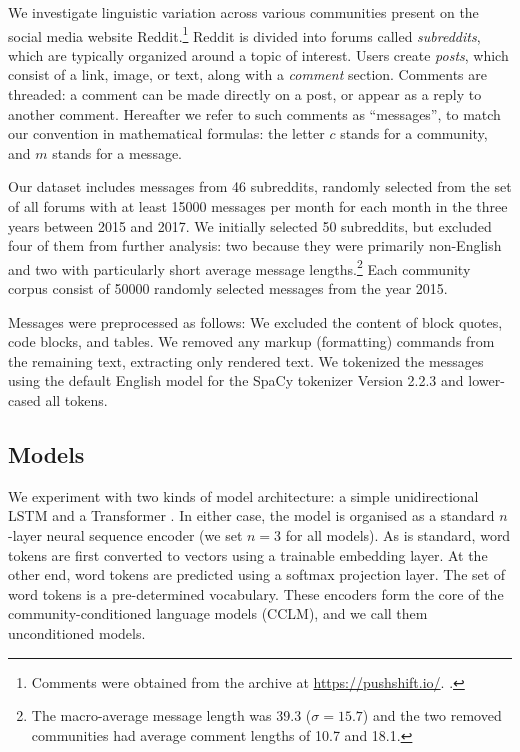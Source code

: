\documentclass[11pt,a4paper]{article}
\begin{document}
We investigate linguistic variation across various communities present
on the social media website Reddit.\footnote{Comments were obtained
  from the archive at \url{https://pushshift.io/}.
  \cite{Baumgartner2020}.}
%
Reddit is divided into forums called \textit{subreddits}, 
which are typically organized around a topic of interest. 
Users create \textit{posts}, which consist of a link, image, 
or text, along with a \emph{comment} section. 
Comments are threaded: a comment can be made directly on a post,
or appear as a reply to another comment.
%
Hereafter we refer to such comments as ``messages'', to match our
convention in mathematical formulas: the letter $c$ stands for a
community, and $m$ stands for a message.

Our dataset includes messages from \num{46} subreddits, 
randomly selected from the set of all forums 
with at least \num{15000} messages per month for each month
in the three years between 2015 and 2017. 
We initially selected \num{50} subreddits, 
but excluded four of them from further analysis: 
two because they were primarily non-English and two with particularly short average message lengths.\footnote{
The macro-average message length was \num{39.3} ($\sigma=15.7$) and the two removed communities had average comment lengths of \num{10.7} and \num{18.1}.}
Each community corpus consist of \num{50000} randomly selected messages from the year 2015.

Messages were preprocessed as follows: 
We excluded the content of block quotes, code blocks, and tables.
We removed any markup (formatting) commands from the remaining text, extracting only rendered text.
We tokenized the messages using the default English model for the SpaCy tokenizer Version 2.2.3 \citep{Honnibal2017}
and lower-cased all tokens.

\subsection{Models}

We experiment with two kinds of model architecture: a simple unidirectional LSTM
\citep{Hochreiter1997} and a Transformer \citep{Vaswani2017}.  In either
case, the model is organised as a standard $n$-layer neural sequence
encoder (we set $n=3$ for all models). As is standard, word tokens are
first converted to vectors using a trainable embedding layer. At the
other end, word tokens are predicted using a softmax projection layer. The set of word tokens is a
pre-determined vocabulary.  These encoders form the core of the
community-conditioned language models (CCLM), and we call them
unconditioned models.
\end{document}
